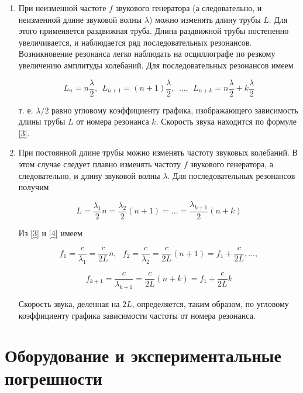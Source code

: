 \documentclass[a4paper,12pt]{article}
\begin{document}
\begin{enumerate}
    \item При неизменной частоте $f$ звукового генератора (а следовательно, и неизменной длине звуковой волны $\lambda$) можно изменять длину трубы $L$. Для этого применяется раздвижная труба. Длина раздвижной трубы постепенно увеличивается, и наблюдается ряд последовательных резонансов. Возникновение резонанса легко наблюдать на осциллографе по резкому увеличению амплитуды колебаний. Для последовательных резонансов имеем
    
    \begin{equation*}
        L_n = n \frac{\lambda}{2}, \ \ L_{n + 1} = (n + 1) \frac{\lambda}{2}, \ \ . . ., \ \ L_{n + k} = n \frac{\lambda}{2} + k \frac{\lambda}{2} 
    \end{equation*}
    
    т. е. $\lambda/2$ равно угловому коэффициенту графика, изображающего зависимость длины трубы $L$ от номера резонанса $k$. Скорость звука находится по формуле \eqref{3}.
    \item При постоянной длине трубы можно изменять частоту звуковых колебаний. В этом случае следует плавно изменять частоту $f$ звукового генератора, а следовательно, и длину звуковой волны $\lambda$. Для последовательных резонансов получим

    \begin{equation}\label{4}
        L = \frac{\lambda_1}{2}n = \frac{\lambda_2}{2}(n + 1) = ... = \frac{\lambda_{k + 1}}{2} (n + k)
    \end{equation}

    Из \eqref{3} и \eqref{4} имеем

    \begin{equation*}
        f_1 = \frac{c}{\lambda_1} = \frac{c}{2L}n, \ \ \ f_2 = \frac{c}{\lambda_2} = \frac{c}{2L}(n + 1) = f_1 + \frac{c}{2L}, ..., 
    \end{equation*}

    \begin{equation}\label{5}
        f_{k + 1} = \frac{c}{\lambda_{k+1}} = \frac{c}{2L}(n + k) = f_1 + \frac{c}{2L}k
    \end{equation}

    Скорость звука, деленная на $2L$, определяется, таким образом, по угловому коэффициенту графика зависимости частоты от номера резонанса.
\end{enumerate}

\section{Оборудование и экспериментальные погрешности}
\end{document}
